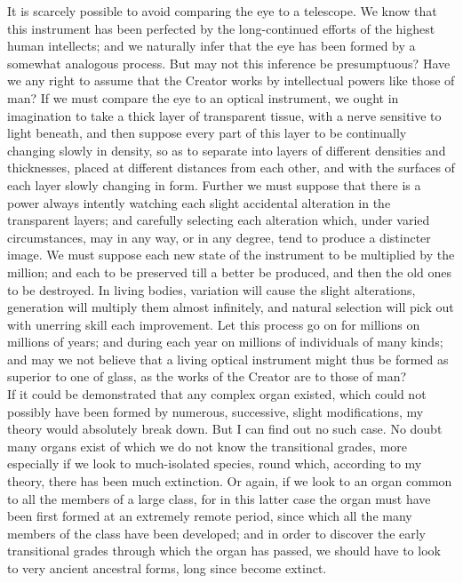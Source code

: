 \indent It is scarcely possible to avoid comparing the eye to a telescope. We know that this instrument has been perfected by the long-continued efforts of the highest human intellects; and we naturally infer that the eye has been formed by a somewhat analogous process. But may not this inference be presumptuous? Have we any right to assume that the Creator works by intellectual powers like those of man? If we must compare the eye to an optical instrument, we ought in imagination to take a thick layer of transparent tissue, with a nerve sensitive to light beneath, and then suppose every part of this layer to be continually changing slowly in density, so as to separate into layers of different densities and thicknesses, placed at different distances from each other, and with the surfaces of each layer slowly changing in form. Further we must suppose that there is a power always intently watching each slight accidental alteration in the transparent layers; and carefully selecting each alteration which, under varied circumstances, may in any way, or in any degree, tend to produce a distincter image. We must suppose each new state of the instrument to be multiplied by the million; and each to be preserved till a better be produced, and then the old ones to be destroyed. In living bodies, variation will cause the slight alterations, generation will multiply them almost infinitely, and natural selection will pick out with unerring skill each improvement. Let this process go on for millions on millions of years; and during each year on millions of individuals of many kinds; and may we not believe that a living optical instrument might thus be formed as superior to one of glass, as the works of the Creator are to those of man?\\
\indent If it could be demonstrated that any complex organ existed, which could not possibly have been formed by numerous, successive, slight modifications, my theory would absolutely break down. But I can find out no such case. No doubt many organs exist of which we do not know the transitional grades, more especially if we look to much-isolated species, round which, according to my theory, there has been much extinction. Or again, if we look to an organ common to all the members of a large class, for in this latter case the organ must have been first formed at an extremely remote period, since which all the many members of the class have been developed; and in order to discover the early transitional grades through which the organ has passed, we should have to look to very ancient ancestral forms, long since become extinct.\\
